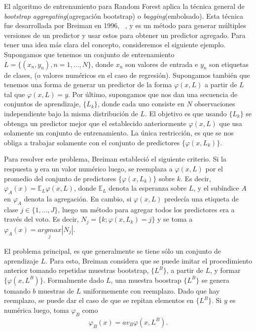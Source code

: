 	El algoritmo de entrenamiento para Random Forest aplica la técnica general de \textit{bootstrap aggregating}(agregación bootstrap) o \textit{bagging}(embolsado). Esta técnica fue desarrollada por Breiman en 1996, ~\cite{LBreiman96}, y es un método para generar múltiples versiones de un predictor y usar estos para obtener un predictor agregado. Para tener una idea más clara del concepto, consideremos el siguiente ejemplo. Supongamos que tenemos un conjunto de entrenamiento $L = \{ (x_n,y_n), n = 1,\dots, N \}$, donde $x_n$ son valores de entrada e $y_n$ son etiquetas de clases, (o valores numéricos en el caso de regresión). Supongamos también que tenemos una forma de generar un predictor de la forma $\varphi(x,L)$ a partir de $L$ tal que $ \varphi(x,L) = y $. Por último, supongamos que nos dan una secuencia de conjuntos de aprendizaje, $\{ L_k \}$, donde cada uno consiste en $N$ observaciones independiente bajo la misma distribución de $L$. El objetivo es que usando $\{ L_k \}$ se obtenga un predictor mejor que el establecido anteriormente $\varphi(x,L)$ que usa solamente un conjunto de entrenamiento. La única restricción, es que se nos obliga a trabajar solamente con el conjunto de predictores $\{ \varphi(x, L_k)\} $.

	Para resolver este problema, Breiman estableció el siguiente criterio. Si la respuesta $y$ era un valor numérico luego, se reemplaza a $\varphi(x,L)$ por el promedio del conjunto de predictores $ \{ \varphi(x, L_k) \} $ sobre $k$. Es decir, $\varphi_A(x) = \mathbb{E}_L\varphi(x,L)$, donde $\mathbb{E}_L$ denota la esperanza sobre $L$, y el subíndice $A$ en $\varphi_A$ denota la agregación. En cambio, si $\varphi(x,L)$ predecía una etiqueta de clase $j \in \{ 1,\dots, J \} $, luego un método para agregar todos los predictores era a través del voto. Es decir, $N_j = \{ k;\varphi(x, L_k) = j \}$ y se toma a $\varphi_A(x) = \underset{j}{argmax}|N_j|$.

	El problema principal, es que generalmente se tiene sólo un conjunto de aprendizaje $L$. Para esto, Breiman considera que se puede imitar el procedimiento anterior tomando repetidas muestras bootstrap, $\{ L^{B} \}$, a partir de $L$, y formar $\{ \varphi(x, L^{B}) \}$. Formalmente dado $L$, una muestra boostrap $\{ L^{B} \}$ se genera tomando $b$ muestras de $L$ uniformemente con reemplazo. Dado que hay reemplazo, se puede dar el caso de que se repitan elementos en $\{ L^{B} \}$. Si $y$ es numérica luego, toma $\varphi_B$ como
	\begin{align*}
		\varphi_B(x) = av_B\varphi(x,L^{B}).
	\end{align*}

